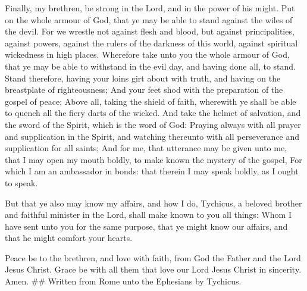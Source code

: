  Finally, my brethren, be strong in the Lord, and in the
power of his might.  Put on the whole armour of God, that
ye may be able to stand against the wiles of the devil. 
For we wrestle not against flesh and blood, but against principalities,
against powers, against the rulers of the darkness of this world,
against spiritual wickedness in high places.  Wherefore
take unto you the whole armour of God, that ye may be able to withstand
in the evil day, and having done all, to stand.  Stand
therefore, having your loins girt about with truth, and having on the
breastplate of righteousness;  And your feet shod with the
preparation of the gospel of peace;  Above all, taking the
shield of faith, wherewith ye shall be able to quench all the fiery
darts of the wicked.  And take the helmet of salvation, and
the sword of the Spirit, which is the word of God:  Praying
always with all prayer and supplication in the Spirit, and watching
thereunto with all perseverance and supplication for all saints;
 And for me, that utterance may be given unto me, that I
may open my mouth boldly, to make known the mystery of the gospel,
 For which I am an ambassador in bonds: that therein I may
speak boldly, as I ought to speak.

 But that ye also may know my affairs, and how I do,
Tychicus, a beloved brother and faithful minister in the Lord, shall
make known to you all things:  Whom I have sent unto you
for the same purpose, that ye might know our affairs, and that he might
comfort your hearts.

 Peace be to the brethren, and love with faith, from God
the Father and the Lord Jesus Christ.  Grace be with all
them that love our Lord Jesus Christ in sincerity. Amen. \#\# Written
from Rome unto the Ephesians by Tychicus.
